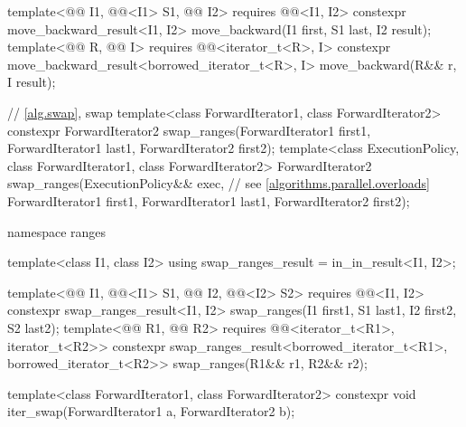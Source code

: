 \begin{codeblock}
{{    template<@@ I1, @@<I1> S1, @@ I2>
      requires @@<I1, I2>
      constexpr move_backward_result<I1, I2>
        move_backward(I1 first, S1 last, I2 result);
    template<@@ R, @@ I>
      requires @@<iterator_t<R>, I>
      constexpr move_backward_result<borrowed_iterator_t<R>, I>
        move_backward(R&& r, I result);
  }

  // \ref{alg.swap}, swap
  template<class ForwardIterator1, class ForwardIterator2>
    constexpr ForwardIterator2 swap_ranges(ForwardIterator1 first1, ForwardIterator1 last1,
                                           ForwardIterator2 first2);
  template<class ExecutionPolicy, class ForwardIterator1, class ForwardIterator2>
    ForwardIterator2 swap_ranges(ExecutionPolicy&& exec,        // see \ref{algorithms.parallel.overloads}
                                 ForwardIterator1 first1, ForwardIterator1 last1,
                                 ForwardIterator2 first2);

  namespace ranges {
    template<class I1, class I2>
      using swap_ranges_result = in_in_result<I1, I2>;

    template<@@ I1, @@<I1> S1, @@ I2, @@<I2> S2>
      requires @@<I1, I2>
      constexpr swap_ranges_result<I1, I2>
        swap_ranges(I1 first1, S1 last1, I2 first2, S2 last2);
    template<@@ R1, @@ R2>
      requires @@<iterator_t<R1>, iterator_t<R2>>
      constexpr swap_ranges_result<borrowed_iterator_t<R1>, borrowed_iterator_t<R2>>
        swap_ranges(R1&& r1, R2&& r2);
  }

  template<class ForwardIterator1, class ForwardIterator2>
    constexpr void iter_swap(ForwardIterator1 a, ForwardIterator2 b);

}
\end{codeblock}
